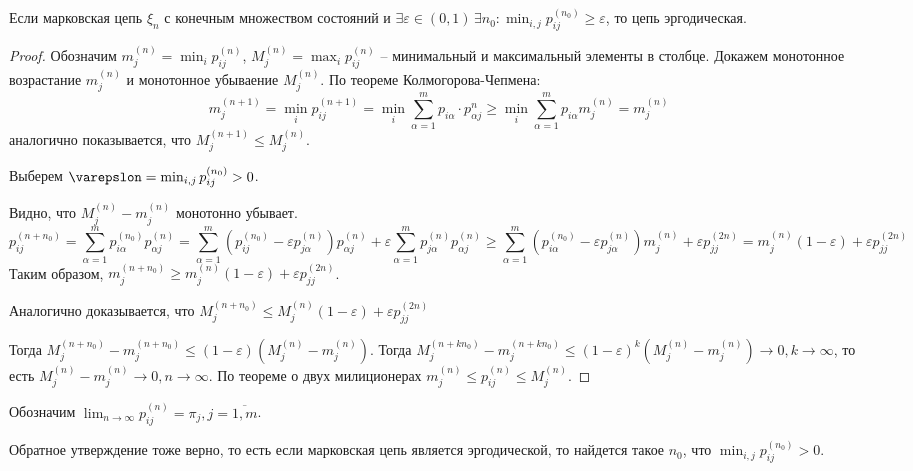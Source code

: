 \begin{theorem}
  Если марковская цепь $\xi_n$ с конечным множеством состояний и $\exists \varepsilon\in(0, 1) \, \exists n_0 : \min_{i, j} p_{ij}^{(n_0)} \geqslant \varepsilon$, то цепь эргодическая.
\end{theorem}
\begin{proof}
  Обозначим $m_j^{(n)} = \min_i p_{ij}^{(n)}$, $M_j^{(n)} = \max_i p_{ij}^{(n)}$ -- минимальный 
  и максимальный элементы в столбце. Докажем монотонное возрастание $m_{j}^{(n)}$ и монотонное
  убываение $M_j^{(n)}$. По теореме Колмогорова-Чепмена:
  \[
    m_{j}^{(n+1)} = \min_i p_{ij}^{(n+1)}
    = \min_i \sum_{\alpha=1}^m p_{i\alpha} \cdot p_{\alpha j}^{n} \geqslant 
    \min_i \sum_{\alpha=1}^m p_{i \alpha} m_j^{(n)}
    = m_j^{(n)}
  \]
  аналогично показывается, что $M_{j}^{(n+1)} \leqslant M_j^{(n)}$.


  Выберем $\varepslon = \min_{i, j} p_{ij}^{(n_0)} > 0$.

  Видно, что $M_j^{(n)}-m_j^{(n)}$ монотонно убывает.
  \[
    p_{ij}^{(n+n_0)} = \sum_{\alpha=1}^m p_{i\alpha}^{(n_0)} p_{\alpha j}^{(n)}
    = \sum_{\alpha=1}^m (p_{ij}^{(n_0)} - \varepsilon p_{j \alpha}^{(n)}) p_{\alpha j}^{(n)}
      + \varepsilon \sum_{\alpha=1}^m p_{j \alpha}^{(n)} p_{\alpha j}^{(n)}
    \geqslant \sum_{\alpha=1}^m (p_{i\alpha}^{(n_0)} - \varepsilon p_{j\alpha}^{(n)}) m_j^{(n)}
      + \varepsilon p_{jj}^{(2n)}
    = m_j^{(n)} (1-\varepsilon) + \varepsilon p_{jj}^{(2n)}
  \]
  Таким образом, $m_j^{(n+n_0)} \geqslant m_j^{(n)} (1-\varepsilon) + \varepsilon p_{jj}^{(2n)}$.
  
  Аналогично доказывается, что $M_j^{(n+n_0)} \leqslant M_j^{(n)} (1-\varepsilon) + \varepsilon p_{jj}^{(2n)}$
  
  Тогда $M_{j}^{(n+n_0)} - m_j^{(n+n_0)} \leqslant (1-\varepsilon) (M_j^{(n)} - m_j^{(n)})$. 
  Тогда $M_j^{(n+kn_0)} - m_j^{(n+kn_0)} \leqslant (1-\varepsilon)^k (M_j^{(n)} - m_j^{(n)}) \to 0, k\to \infty$, то есть $M_{j}^{(n)} - m_j^{(n)} \to 0, n \to \infty$. По теореме о двух милиционерах
  $m_j^{(n)} \leqslant p_{ij}^{(n)} \leqslant M_j^{(n)}$.
  
\end{proof}

Обозначим $\lim_{n\to\infty} p_{ij}^{(n)} = \pi_j, j = \overline{1, m}$. 

\begin{remark}
  Обратное утверждение тоже верно, то есть если марковская цепь является эргодической, то найдется
  такое $n_0$, что $\min_{i, j} p_{ij}^{(n_0)} > 0$.
\end{remark}

